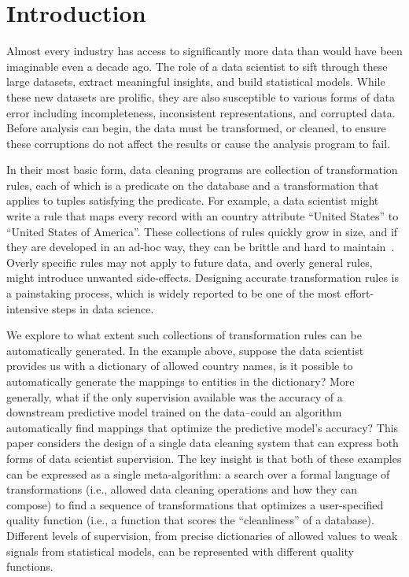 \section{Introduction}\label{intro}\sloppy
Almost every industry has access to significantly more data than would have been imaginable even a decade ago.
The role of a data scientist to sift through these large datasets, extract meaningful insights, and build statistical models.
While these new datasets are prolific, they are also susceptible to various forms of data error including incompleteness, inconsistent representations, and corrupted data.
Before analysis can begin, the data must be transformed, or cleaned, to ensure these corruptions do not affect the results or cause the analysis program to fail.

In their most basic form, data cleaning programs are collection of transformation rules, each of which is a predicate on the database and a transformation that applies to tuples satisfying the predicate.
For example, a data scientist might write a rule that maps every record with an \textsf{country} attribute ``United States'' to ``United States of America''.
These collections of rules quickly grow in size, and if they are developed in an ad-hoc way, they can be brittle and hard to maintain~\cite{krishnan2016hilda}.
Overly specific rules may not apply to future data, and overly general rules, might introduce unwanted side-effects.
Designing accurate transformation rules is a painstaking process, which is widely reported to be one of the most effort-intensive steps in data science.

We explore to what extent such collections of transformation rules can be automatically generated.
In the example above, suppose the data scientist provides us with a dictionary of allowed country names, is it possible to automatically generate the mappings to entities in the dictionary?
More generally, what if the only supervision available was the accuracy of a downstream predictive model trained on the data--could an algorithm automatically find mappings that optimize the predictive model's accuracy?
This paper considers the design of a single data cleaning system that can express both forms of data scientist supervision.
The key insight is that both of these examples can be expressed as a single meta-algorithm:  a search over a formal language of transformations (i.e., allowed data cleaning operations and how they can compose) to find a sequence of transformations that optimizes a user-specified quality function (i.e., a function that scores the ``cleanliness'' of a database).
Different levels of supervision, from precise dictionaries of allowed values to weak signals from statistical models, can be represented with different quality functions.

